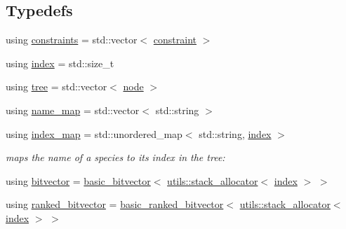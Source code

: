 \subsection*{Typedefs}
\begin{DoxyCompactItemize}
\item 
using \hyperlink{namespaceterraces_a6f603ffd30ed4d902fce6424492e0581}{constraints} = std\+::vector$<$ \hyperlink{structterraces_1_1constraint}{constraint} $>$
\item 
using \hyperlink{namespaceterraces_adbc33ccb543d1634e96d0eb02e472c77}{index} = std\+::size\+\_\+t
\item 
using \hyperlink{namespaceterraces_a07aaf7feec4a22c6cdefc14c5a81bdd0}{tree} = std\+::vector$<$ \hyperlink{structterraces_1_1node}{node} $>$
\item 
using \hyperlink{namespaceterraces_a4ef0217fe5aed881737d9bc5a8d45dca}{name\+\_\+map} = std\+::vector$<$ std\+::string $>$
\item 
using \hyperlink{namespaceterraces_a148f3e895119c2a72d995caae669e40d}{index\+\_\+map} = std\+::unordered\+\_\+map$<$ std\+::string, \hyperlink{namespaceterraces_adbc33ccb543d1634e96d0eb02e472c77}{index} $>$
\begin{DoxyCompactList}\small\item\em maps the name of a species to it\textquotesingle{}s index in the tree\+: \end{DoxyCompactList}\item 
using \hyperlink{namespaceterraces_a1b526fb554dff829f7ad51eb21d5ed06}{bitvector} = \hyperlink{classterraces_1_1basic__bitvector}{basic\+\_\+bitvector}$<$ \hyperlink{classterraces_1_1utils_1_1stack__allocator}{utils\+::stack\+\_\+allocator}$<$ \hyperlink{namespaceterraces_adbc33ccb543d1634e96d0eb02e472c77}{index} $>$ $>$
\item 
using \hyperlink{namespaceterraces_acc45ec9c561024c50ecbce5b6738ba08}{ranked\+\_\+bitvector} = \hyperlink{classterraces_1_1basic__ranked__bitvector}{basic\+\_\+ranked\+\_\+bitvector}$<$ \hyperlink{classterraces_1_1utils_1_1stack__allocator}{utils\+::stack\+\_\+allocator}$<$ \hyperlink{namespaceterraces_adbc33ccb543d1634e96d0eb02e472c77}{index} $>$ $>$
\end{DoxyCompactItemize}
